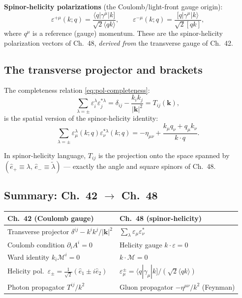 \begin{mdframed}[backgroundcolor=blue!5]
\textbf{Spinor-helicity polarizations} (the Coulomb/light-front gauge origin):
\begin{equation}\label{eq:helicity-pol-spinor}
  \varepsilon^{+\mu}(k;q) = \frac{\langle q|\gamma^\mu|k]}{\sqrt{2}\langle qk\rangle},
  \qquad
  \varepsilon^{-\mu}(k;q) = \frac{[q|\gamma^\mu|k\rangle}{\sqrt{2}[qk]},
\end{equation}
where $q^\mu$ is a reference (gauge) momentum.  These are the spinor-helicity
polarization vectors of Ch.~48, \emph{derived from} the transverse gauge
of Ch.~42.
\end{mdframed}

\subsection{The transverse projector and brackets}

The completeness relation \eqref{eq:pol-completeness}:
\begin{equation}
  \sum_{\lambda=\pm}\varepsilon_{i}^\lambda\varepsilon_j^{*\lambda}
  = \delta_{ij} - \frac{k_ik_j}{|\mathbf{k}|^2} = T_{ij}(\mathbf{k}),
\end{equation}
is the spatial version of the spinor-helicity identity:
\begin{equation}
  \sum_{\lambda=\pm}\varepsilon_\mu^\lambda(k;q)\varepsilon_\nu^{*\lambda}(k;q)
  = -\eta_{\mu\nu} + \frac{k_\mu q_\nu + q_\mu k_\nu}{k\cdot q}.
\end{equation}

In spinor-helicity language, $T_{ij}$ is the projection onto the space spanned by
$(\hat e_+ \equiv \lambda,\, \hat e_- \equiv \tilde\lambda)$ --- exactly the angle
and square spinors of Ch.~48.

\subsection{Summary: Ch.~42 $\to$ Ch.~48}

\begin{center}
\begin{tabular}{ll}
\toprule
Ch.~42 (Coulomb gauge) & Ch.~48 (spinor-helicity) \\
\midrule
Transverse projector $\delta^{ij}-k^ik^j/|\mathbf{k}|^2$ & $\sum_\lambda\varepsilon_\mu\varepsilon_\nu^*$ \\
Coulomb condition $\partial_i A^i=0$ & Helicity gauge $k\cdot\varepsilon=0$ \\
Ward identity $k_i\mathcal{M}^i=0$ & $k\cdot\mathcal{M}=0$ \\
Helicity pol.\ $\varepsilon_\pm = \frac{1}{\sqrt2}(\hat e_1\pm i\hat e_2)$ & $\varepsilon^\pm_\mu=\langle q|\gamma_\mu|k]/(\sqrt2\langle qk\rangle)$ \\
Photon propagator $T^{ij}/k^2$ & Gluon propagator $-\eta^{\mu\nu}/k^2$ (Feynman) \\
\bottomrule
\end{tabular}
\end{center}

